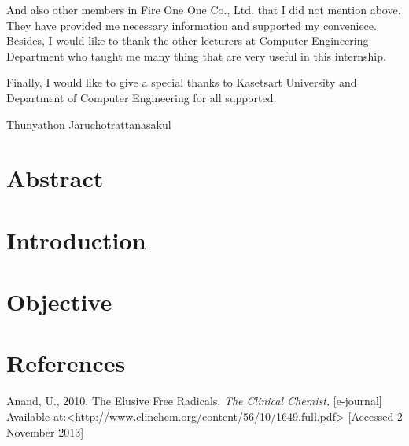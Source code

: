 \documentclass[12pt]{report}
\begin{document}
	And also other members in Fire One One Co., Ltd. that I did not mention above. They have provided me necessary information and supported my conveniece. Besides, I would like to thank the other lecturers at Computer Engineering Department who taught me many thing that are very useful in this internship.

	Finally, I would like to give a special thanks to Kasetsart University and Department of Computer Engineering for all supported.

	\vspace{2cm}

	\begin{flushright}
	Thunyathon Jaruchotrattanasakul
	\end{flushright}


	
\newpage
\section*{Abstract}
\lipsum

\tableofcontents
\newpage

\listoffigures
\newpage

\sectionfont{\scshape}

\newpage
\section*{Introduction}
\lipsum


\newpage
\section*{Objective}
\lipsum




\newpage
\section*{References}

Anand, U., 2010. The Elusive Free Radicals, \textit{The Clinical Chemist,} [e-journal] Available at:<\url{http://www.clinchem.org/content/56/10/1649.full.pdf}> [Accessed 2 November 2013]
\newline
\newline
\end{document}
